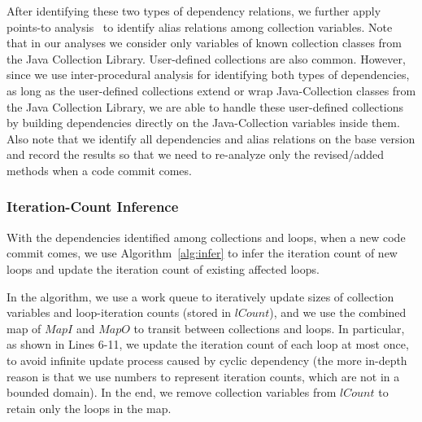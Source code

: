 After identifying these two types of dependency relations, we further apply points-to analysis~\cite{Spark} to identify alias relations among collection variables. Note that in our analyses we consider only variables of known collection classes from the Java Collection Library. User-defined collections are also common. However, since we use inter-procedural analysis for identifying both types of dependencies, as long as the user-defined collections extend or wrap Java-Collection classes from the Java Collection Library, we are able to handle these user-defined collections by building dependencies directly on the Java-Collection variables inside them. Also note that  we identify all dependencies and alias relations on the base version and record the results so that we need to re-analyze only the revised/added methods when a code commit comes. 

\vspace{-0.2cm}
\subsubsection{Iteration-Count Inference}


With the dependencies identified among collections and loops, when a new code commit comes, we use Algorithm~\ref{alg:infer} to infer the iteration count of new loops and update the iteration count of existing affected loops. 

In the algorithm, we use a work queue to iteratively update sizes of collection variables and loop-iteration counts (stored in $lCount$), and we use the combined map of $MapI$ and $MapO$ to transit between collections and loops. In particular, as shown in Lines 6-11, we update the iteration count of each loop at most once, to avoid infinite update process caused by cyclic dependency (the more in-depth reason is that we use numbers to represent iteration counts, which are not in a bounded domain). In the end, we remove collection variables from $lCount$ to retain only the loops in the map.

